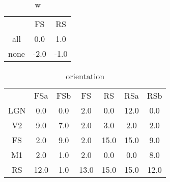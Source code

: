 \begin{table*}[ht]
\begin{center}
\begin{tabular}{ccc} 
 & FS & RS \\ 
all & 0.0 & 1.0 \\ 
none & -2.0 & -1.0 \\ 
\end{tabular} 
\end{center}
\caption{w}
\label{w}
\end{table*}
\begin{table*}[ht]
\begin{center}
\begin{tabular}{ccccccc} 
 & FSa & FSb & FS & RS & RSa & RSb \\ 
LGN & 0.0 & 0.0 & 2.0 & 0.0 & 12.0 & 0.0 \\ 
V2 & 9.0 & 7.0 & 2.0 & 3.0 & 2.0 & 2.0 \\ 
FS & 2.0 & 9.0 & 2.0 & 15.0 & 15.0 & 9.0 \\ 
M1 & 2.0 & 1.0 & 2.0 & 0.0 & 0.0 & 8.0 \\ 
RS & 12.0 & 1.0 & 13.0 & 15.0 & 15.0 & 12.0 \\ 
\end{tabular} 
\end{center}
\caption{orientation}
\label{orientation}
\end{table*}
